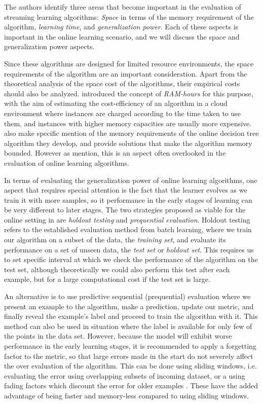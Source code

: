 The authors identify three areas that
become important in the evaluation of streaming learning
algorithms: \emph{Space} in terms of the memory requirement of the algorithm, \emph{learning time}, and \emph{generalization power}.
Each of these aspects is important in the online learning scenario, and
we will discuss the space and generalization power aspects.


Since these algorithms are designed for limited resource environments,
the space requirements of the algorithm are an important consideration.
Apart from the theoretical analysis of the space cost of the algorithms,
their empirical costs should also be analyzed. \citet{ram-hours} introduced
the concept of \emph{RAM-hours} for this purpose, with the aim of estimating
the cost-efficiency of an algorithm in a cloud environment where instances
are charged according to the time taken to use them, and instances with
higher memory capacities are usually more expensive. \citet{vfdt} also
make specific mention of the memory requirements of the online decision
tree algorithm they develop, and provide solutions that make the algorithm
memory bounded. However as \citet{online-evaluation-journal} mention, this
is an aspect often overlooked in the evaluation of online learning
algorithms.

In terms of evaluating the generalization power of online learning
algorithms, one aspect that requires special attention is the fact
that the learner evolves as we train it with more samples, so it
performance in the early stages of learning can be very different
to later stages. The two strategies proposed as viable for the online
setting in \cite{online-evaluation-journal} are \emph{holdout testing}
and \emph{prequential evaluation}. Holdout testing refers to the
established evaluation method from batch learning, where we train
our algorithm on a subset of the data, the \emph{training set},
and evaluate its performance on a set of unseen data, the
\emph{test set} or \emph{holdout set}. This requires us to set
specific interval at which we check the performance of the algorithm
on the test set, although theoretically we could also perform this
test after each example, but for a large computational cost if
the test set is large.

An alternative is to use
predictive sequential (prequential) evaluation where we present
an example to the algorithm, make a prediction, update our metric,
and finally reveal the example's label and proceed to train the
algorithm with it. This method can also be used in situation
where the label is available for only few of the points in the
data set. However, because the model will exhibit worse performance
in the early learning stages, it is recommended to apply a forgetting
factor to the metric, so that large errors made in the start do
not severely affect the over evaluation of the algorithm. This
can be done using sliding windows, i.e. evaluating the error using
overlapping subsets of incoming dataset, or a using fading
factors which discount the error for older examples \cite{online-evaluation-kdd}.
These have the added advantage of being faster and memory-less
compared to using sliding windows.

